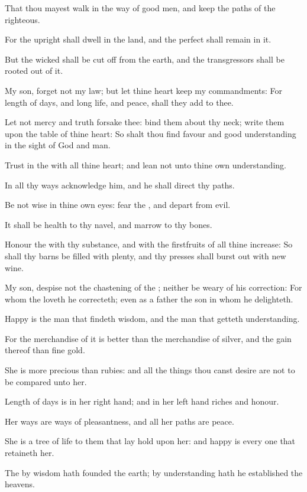 \Verse That thou mayest walk in the way of good men, and keep the paths of the righteous.

\Verse For the upright shall dwell in the land, and the perfect shall remain in it.

\Verse But the wicked shall be cut off from the earth, and the transgressors shall be rooted out of it.


\Chapter
\Verse My son, forget not my law; but let thine heart keep my commandments: \Verse For length of days, and long life, and peace, shall they add to thee.

\Verse Let not mercy and truth forsake thee: bind them about thy neck; write them upon the table of thine heart: \Verse So shalt thou find favour and good understanding in the sight of God and man.

\Verse Trust in the \LORD with all thine heart; and lean not unto thine own understanding.

\Verse In all thy ways acknowledge him, and he shall direct thy paths.

\Verse Be not wise in thine own eyes: fear the \LORD, and depart from evil.

\Verse It shall be health to thy navel, and marrow to thy bones.

\Verse Honour the \LORD with thy substance, and with the firstfruits of all thine increase: \Verse So shall thy barns be filled with plenty, and thy presses shall burst out with new wine.

\Verse My son, despise not the chastening of the \LORD; neither be weary of his correction: \Verse For whom the \LORD loveth he correcteth; even as a father the son in whom he delighteth.

\Verse Happy is the man that findeth wisdom, and the man that getteth understanding.

\Verse For the merchandise of it is better than the merchandise of silver, and the gain thereof than fine gold.

\Verse She is more precious than rubies: and all the things thou canst desire are not to be compared unto her.

\Verse Length of days is in her right hand; and in her left hand riches and honour.

\Verse Her ways are ways of pleasantness, and all her paths are peace.

\Verse She is a tree of life to them that lay hold upon her: and happy is every one that retaineth her.

\Verse The \LORD by wisdom hath founded the earth; by understanding hath he established the heavens.


